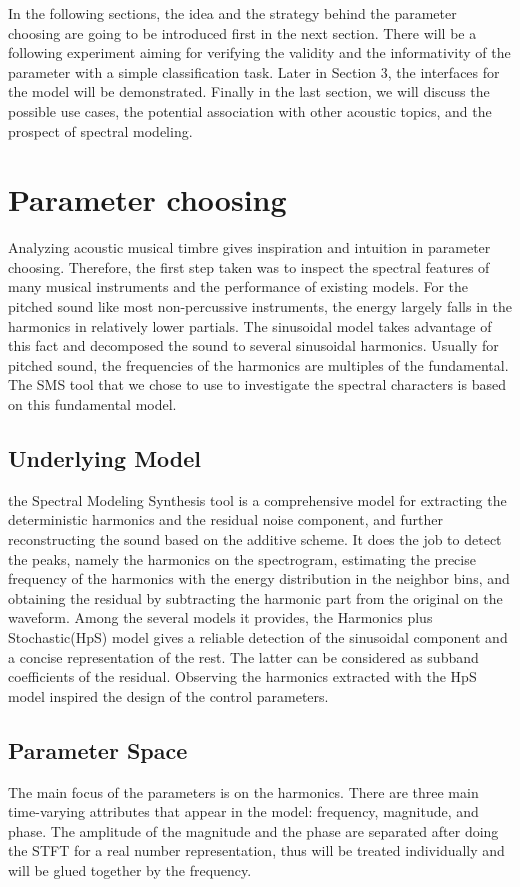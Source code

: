 \documentclass{article}
\begin{document}
In the following sections, the idea and the strategy behind the parameter choosing are going to be introduced first in the next section. There will be a following experiment aiming for verifying the validity and the informativity of the parameter with a simple classification task. Later in Section 3, the interfaces for the model will be demonstrated. Finally in the last section, we will discuss the possible use cases, the potential association with other acoustic topics, and the prospect of spectral modeling.

\section{Parameter choosing}
Analyzing acoustic musical timbre gives inspiration and intuition in parameter choosing. Therefore, the first step taken was to inspect the spectral features of many musical instruments and the performance of existing models. For the pitched sound like most non-percussive instruments, the energy largely falls in the harmonics in relatively lower partials. The sinusoidal model takes advantage of this fact and decomposed the sound to several sinusoidal harmonics. Usually for pitched sound, the frequencies of the harmonics are multiples of the fundamental. The SMS tool\cite{juliussmith1990} that we chose to use to investigate the spectral characters is based on this fundamental model.  
\subsection{Underlying Model}
the Spectral Modeling Synthesis tool is a comprehensive model for extracting the deterministic harmonics and the residual noise component, and further reconstructing the sound based on the additive scheme. It does the job to detect the peaks, namely the harmonics on the spectrogram, estimating the precise frequency of the harmonics with the energy distribution in the neighbor bins, and obtaining the residual by subtracting the harmonic part from the original on the waveform. Among the several models it provides, the Harmonics plus Stochastic(HpS) model gives a reliable detection of the sinusoidal component and a concise representation of the rest. The latter can be considered as subband coefficients of the residual. Observing the harmonics extracted with the HpS model inspired the design of the control parameters.

\subsection{Parameter Space}
The main focus of the parameters is on the harmonics. There are three main time-varying attributes that appear in the model: frequency, magnitude, and phase. The amplitude of the magnitude and the phase are separated after doing the STFT for a real number representation, thus will be treated individually and will be glued together by the frequency.
\end{document}
